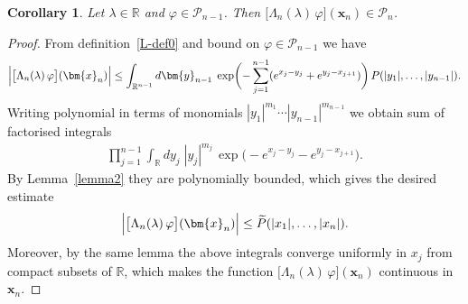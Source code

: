 \documentclass[11pt]{article}
\numberwithin{equation}{section}
\theoremstyle{plain}
\newtheorem{corollary}{Corollary}
\theoremstyle{definition}
\renewcommand{\phi}{\varphi}
\begin{document}
\begin{corollary} \label{cor:LP-inv}
	Let $\lambda \in \mathbb{R}$ and $\phi \in \mathcal{P}_{n - 1}$. Then $\bigl[ \Lambda_n(\lambda) \, \phi \bigr] (\bm{x}_n) \in \mathcal{P}_{n}$.
\end{corollary}

\begin{proof}
	From definition~\eqref{L-def0} and bound on $\phi \in \mathcal{P}_{n - 1}$ we have
	\begin{align}
		\Bigl| 	\bigl[ \Lambda_n(\lambda) \, \phi \bigr] (\bm{x}_n) \Bigr| \leq \int_{\mathbb{R}^{n - 1}} d\bm{y}_{n - 1} \; \exp \biggl(  - \sum_{j = 1}^{n - 1} ( e^{x_j - y_j} + e^{y_j - x_{j + 1} } ) \biggr) \, P(|y_1|, \dots, |y_{n - 1}|).
	\end{align}
	Writing polynomial in terms of monomials $|y_1|^{m_1} \cdots |y_{n - 1}|^{m_{n - 1}}$ we obtain sum of factorised integrals
	\begin{align}
		\prod_{j = 1}^{n - 1} \int_{\mathbb{R}} dy_j \; |y_j|^{m_j} \, \exp \bigl( - e^{x_j - y_j} - e^{y_j - x_{j + 1}} \bigr).
	\end{align}
	By Lemma~\ref{lemma2} they are polynomially bounded, which gives the desired estimate
	\begin{align}
		\Bigl| 	\bigl[ \Lambda_n(\lambda) \, \phi \bigr] (\bm{x}_n) \Bigr| \leq \widetilde{P}(|x_1|, \dots, |x_n|).
	\end{align}
	Moreover, by the same lemma the above integrals converge uniformly in $x_j$ from compact subsets of $\mathbb{R}$, which makes the function $\bigl[ \Lambda_n(\lambda) \, \phi \bigr] (\bm{x}_n)$ continuous in $\bm{x}_n$.
\end{proof}
\end{document}
